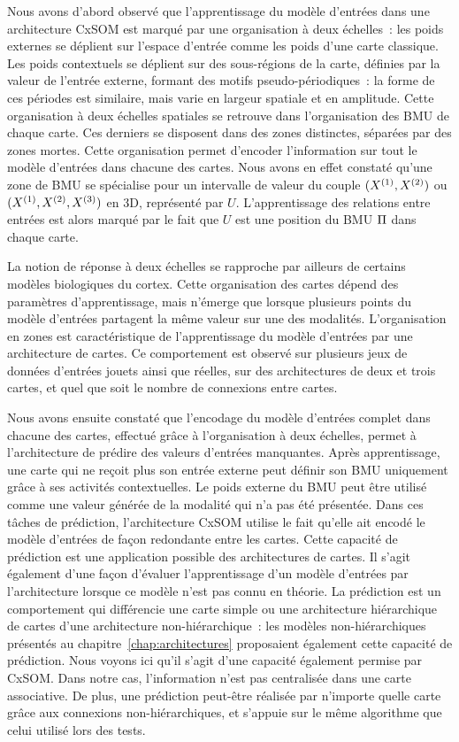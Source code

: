\documentclass[../main]{subfiles}
\begin{document}
Nous avons d'abord observé que l'apprentissage du modèle d'entrées dans une architecture CxSOM est marqué par une organisation à deux échelles~: les poids externes se déplient sur l'espace d'entrée comme les poids d'une carte classique. Les poids contextuels se déplient sur des sous-régions de la carte, définies par la valeur de l'entrée externe, formant des motifs pseudo-périodiques~: la forme de ces périodes est similaire, mais varie en largeur spatiale et en amplitude. 
Cette organisation à deux échelles spatiales se retrouve dans l'organisation des BMU de chaque carte.
Ces derniers se disposent dans des zones distinctes, séparées par des zones mortes. 
Cette organisation permet d'encoder l'information sur tout le modèle d'entrées dans chacune des cartes. Nous avons en effet constaté qu'une zone de BMU se spécialise pour un intervalle de valeur du couple $(X^{({1})}, X^{({2})})$ ou $(X^{({1})}, X^{({2})}, X^{({3})})$ en 3D, représenté par $U$. L'apprentissage des relations entre entrées est alors marqué par le fait que $U$ est une position du BMU $\Pi$ dans chaque carte.

La notion de réponse à deux échelles se rapproche par ailleurs de certains modèles biologiques du cortex.
Cette organisation des cartes dépend des paramètres d'apprentissage, mais n'émerge que lorsque plusieurs points du modèle d'entrées partagent la même valeur sur une des modalités.
L'organisation en zones est caractéristique de l'apprentissage du modèle d'entrées par une architecture de cartes. Ce comportement est observé sur plusieurs jeux de données d'entrées jouets ainsi que réelles, sur des architectures de deux et trois cartes, et quel que soit le nombre de connexions entre cartes.


Nous avons ensuite constaté que l'encodage du modèle d'entrées complet dans chacune des cartes, effectué grâce à l'organisation à deux échelles, permet à l'architecture de prédire des valeurs d'entrées manquantes. Après apprentissage, une carte qui ne reçoit plus son entrée externe peut définir son BMU uniquement grâce à ses activités contextuelles.
Le poids externe du BMU peut être utilisé comme une valeur générée de la modalité qui n'a pas été présentée.
Dans ces tâches de prédiction, l'architecture CxSOM utilise le fait qu'elle ait encodé le modèle d'entrées de façon redondante entre les cartes. 
Cette capacité de prédiction est une application possible des architectures de cartes. Il s'agit également d'une façon d'évaluer l'apprentissage d'un modèle d'entrées par l'architecture lorsque ce modèle n'est pas connu en théorie.
La prédiction est un comportement qui différencie une carte simple ou une architecture hiérarchique de cartes d'une architecture non-hiérarchique~: les modèles non-hiérarchiques présentés au chapitre~\ref{chap:architectures} proposaient également cette capacité de prédiction. Nous voyons ici qu'il s'agit d'une capacité également permise par CxSOM. Dans notre cas, l'information n'est pas centralisée dans une carte associative. De plus, une prédiction peut-être réalisée par n'importe quelle carte grâce aux connexions non-hiérarchiques, et s'appuie sur le même algorithme que celui utilisé lors des tests.
\end{document}
